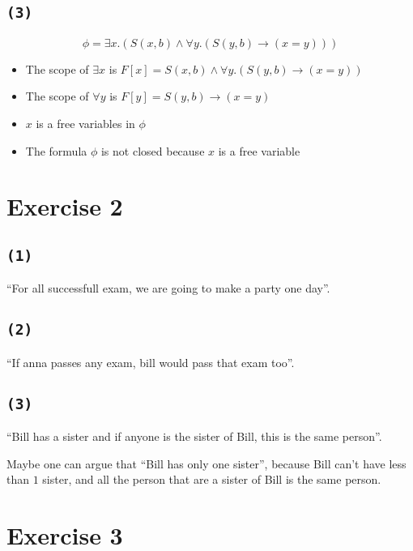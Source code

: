 \documentclass[a4paper,11pt]{report}
\begin{document}
\subsection*{\texttt{(3)}}

\[
  \phi = \exists x.(S(x,b) \wedge \forall y.(S(y,b) \to (x = y)))
\]

\begin{itemize}
\item The scope of $\exists x$ is $F[x] = S(x,b) \wedge \forall y.(S(y,b) \to (x = y))$
\item The scope of $\forall y$ is $F[y] = S(y,b) \to (x = y)$
\item $x$ is a free variables in $\phi$
\item The formula $\phi$ is not closed because $x$ is a free variable
\end{itemize}

\section*{Exercise 2}

\subsection*{\texttt{(1)}}

``For all successfull exam, we are going to make a party one day''.

\subsection*{\texttt{(2)}}

``If anna passes any exam, bill would pass that exam too''.

\subsection*{\texttt{(3)}}

``Bill has a sister and if anyone is the sister of Bill, this is the same
person''.

\vspace*{0.3cm}

Maybe one can argue that ``Bill has only one sister'', because Bill can't have
less than $1$ sister, and all the person that are a sister of Bill is the same
person.

\section*{Exercise 3}
\end{document}
